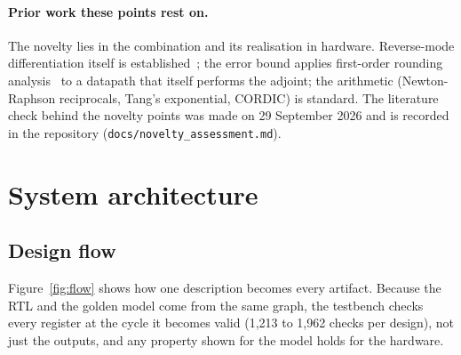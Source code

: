 \documentclass[11pt,a4paper]{article}
\begin{document}
\paragraph{Prior work these points rest on.} The novelty lies in the combination
and its realisation in hardware. Reverse-mode differentiation itself is
established~\cite{linnainmaa,giles}; the error bound applies first-order rounding
analysis~\cite{linnainmaa} to a datapath that itself performs the adjoint; the
arithmetic (Newton-Raphson reciprocals, Tang's exponential, CORDIC) is standard. The
literature check behind the novelty points was made on 29 September 2026 and is
recorded in the repository (\texttt{docs/novelty\_assessment.md}).

\section{System architecture}

\subsection{Design flow}
Figure~\ref{fig:flow} shows how one description becomes every artifact. Because the
RTL and the golden model come from the same graph, the testbench checks every
register at the cycle it becomes valid (1,213 to 1,962 checks per design), not just
the outputs, and any property shown for the model holds for the hardware.
\end{document}
